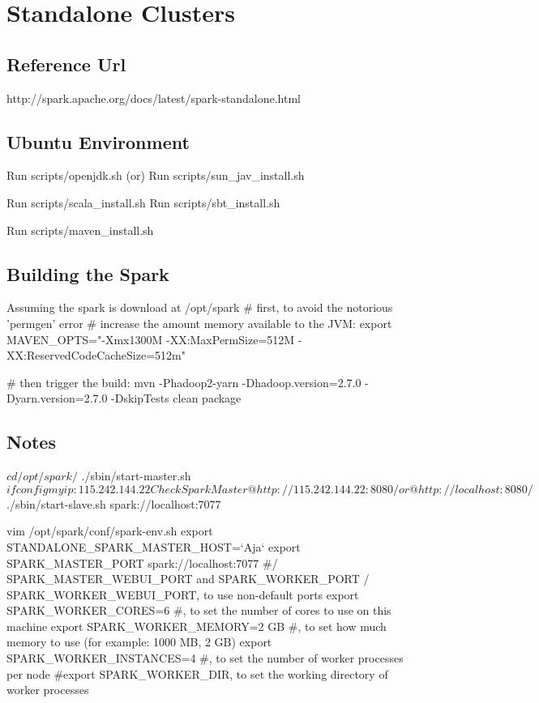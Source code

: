 \chapter{Standalone Clusters}

\section{Reference Url}
 http://spark.apache.org/docs/latest/spark-standalone.html

\section{Ubuntu Environment}

Run scripts/openjdk.sh (or)
Run scripts/sun_jav_install.sh

Run scripts/scala_install.sh
Run scripts/sbt_install.sh

Run scripts/maven_install.sh

\section{Building the Spark}
Assuming the spark is download at /opt/spark
# first, to avoid the notorious 'permgen' error
# increase the amount memory available to the JVM:
export MAVEN_OPTS="-Xmx1300M -XX:MaxPermSize=512M -XX:ReservedCodeCacheSize=512m"

# then trigger the build:
mvn -Phadoop2-yarn -Dhadoop.version=2.7.0 -Dyarn.version=2.7.0 -DskipTests clean package

\section {Notes}
$ cd /opt/spark/
$ ./sbin/start-master.sh
$ ifconfig
my ip: 115.242.144.22
Check Spark Master @ http://115.242.144.22:8080/ or @ http://localhost:8080/
$ ./sbin/start-slave.sh spark://localhost:7077


vim  /opt/spark/conf/spark-env.sh
export STANDALONE_SPARK_MASTER_HOST=`Aja`
export SPARK_MASTER_PORT spark://localhost:7077
#/ SPARK_MASTER_WEBUI_PORT and SPARK_WORKER_PORT / SPARK_WORKER_WEBUI_PORT, to use non-default ports
export SPARK_WORKER_CORES=6 #, to set the number of cores to use on this machine
export SPARK_WORKER_MEMORY=2 GB #, to set how much memory to use (for example: 1000 MB, 2 GB)
export SPARK_WORKER_INSTANCES=4 #, to set the number of worker processes per node
#export SPARK_WORKER_DIR, to set the working directory of worker processes

